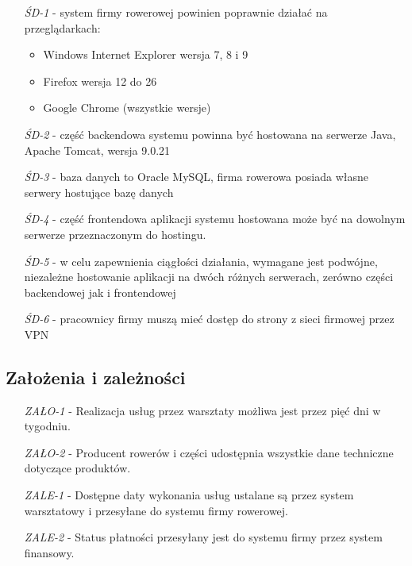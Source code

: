 \documentclass[a4paper,20pt]{article}
\begin{document}
\begin{itemize}[itemindent=4em]
  \item[\textit{ŚD-1}] - system firmy rowerowej powinien poprawnie działać na przeglądarkach: 
  \begin{itemize}[itemindent=4em]
  	\item Windows Internet Explorer wersja 7, 8 i 9
  	\item Firefox wersja 12 do 26
  	\item Google Chrome (wszystkie wersje)
  \end{itemize}
  \item[\textit{ŚD-2}] - część backendowa systemu powinna być hostowana na serwerze Java, Apache Tomcat, wersja 9.0.21 \\
  \item[\textit{ŚD-3}] - baza danych to Oracle MySQL, firma rowerowa posiada własne serwery hostujące bazę danych \\
  \item[\textit{ŚD-4}] - część frontendowa aplikacji systemu hostowana może być na dowolnym serwerze przeznaczonym do hostingu. \\
  \item[\textit{ŚD-5}] - w celu zapewnienia ciągłości działania, wymagane jest podwójne, niezależne hostowanie aplikacji na dwóch różnych serwerach, zerówno części backendowej jak i frontendowej \\
  \item[\textit{ŚD-6}] - pracownicy firmy muszą mieć dostęp do strony z sieci firmowej przez VPN
\end{itemize}






\newpage
\subsection{Założenia i zależności}


\begin{itemize}[itemindent=4em]
  \item[\textit{ZAŁO-1}] - Realizacja usług przez warsztaty możliwa jest przez pięć dni w tygodniu.  \\
  \item[\textit{ZAŁO-2}] - Producent rowerów i części udostępnia wszystkie dane techniczne dotyczące produktów. \\
  \item[\textit{ZALE-1}] - Dostępne daty wykonania usług ustalane są przez system warsztatowy i przesyłane do systemu firmy rowerowej.   \\
  \item[\textit{ZALE-2}] - Status płatności przesyłany jest do systemu firmy przez system finansowy.  \\  
\end{itemize}
\end{document}
